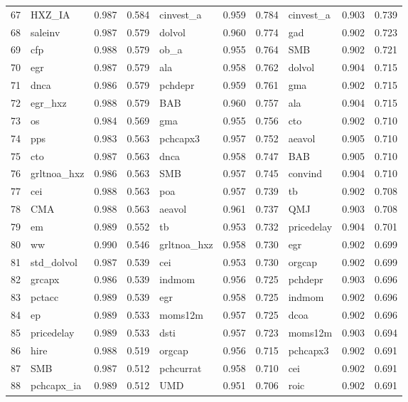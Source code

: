 \begin{landscape}
\begin{footnotesize}
\begin{longtable}{l|lcc|lcc|lcc}
  67 & HXZ\_IA & 0.987 & 0.584 & cinvest\_a & 0.959 & 0.784 & cinvest\_a & 0.903 & 0.739 \\ 
  68 & saleinv & 0.987 & 0.579 & dolvol & 0.960 & 0.774 & gad & 0.902 & 0.723 \\ 
  69 & cfp & 0.988 & 0.579 & ob\_a & 0.955 & 0.764 & SMB & 0.902 & 0.721 \\ 
  70 & egr & 0.987 & 0.579 & ala & 0.958 & 0.762 & dolvol & 0.904 & 0.715 \\ 
  71 & dnca & 0.986 & 0.579 & pchdepr & 0.959 & 0.761 & gma & 0.902 & 0.715 \\ 
  72 & egr\_hxz & 0.988 & 0.579 & BAB & 0.960 & 0.757 & ala & 0.904 & 0.715 \\ 
  73 & os & 0.984 & 0.569 & gma & 0.955 & 0.756 & cto & 0.902 & 0.710 \\ 
  74 & pps & 0.983 & 0.563 & pchcapx3 & 0.957 & 0.752 & aeavol & 0.905 & 0.710 \\ 
  75 & cto & 0.987 & 0.563 & dnca & 0.958 & 0.747 & BAB & 0.905 & 0.710 \\ 
  76 & grltnoa\_hxz & 0.986 & 0.563 & SMB & 0.957 & 0.745 & convind & 0.904 & 0.710 \\ 
  77 & cei & 0.988 & 0.563 & poa & 0.957 & 0.739 & tb & 0.902 & 0.708 \\ 
  78 & CMA & 0.988 & 0.563 & aeavol & 0.961 & 0.737 & QMJ & 0.903 & 0.708 \\ 
  79 & em & 0.989 & 0.552 & tb & 0.953 & 0.732 & pricedelay & 0.904 & 0.701 \\ 
  80 & ww & 0.990 & 0.546 & grltnoa\_hxz & 0.958 & 0.730 & egr & 0.902 & 0.699 \\ 
  81 & std\_dolvol & 0.987 & 0.539 & cei & 0.953 & 0.730 & orgcap & 0.902 & 0.699 \\ 
  82 & grcapx & 0.986 & 0.539 & indmom & 0.956 & 0.725 & pchdepr & 0.903 & 0.696 \\ 
  83 & pctacc & 0.989 & 0.539 & egr & 0.958 & 0.725 & indmom & 0.902 & 0.696 \\ 
  84 & ep & 0.989 & 0.533 & moms12m & 0.957 & 0.725 & dcoa & 0.902 & 0.696 \\ 
  85 & pricedelay & 0.989 & 0.533 & dsti & 0.957 & 0.723 & moms12m & 0.903 & 0.694 \\ 
  86 & hire & 0.988 & 0.519 & orgcap & 0.956 & 0.715 & pchcapx3 & 0.902 & 0.691 \\ 
  87 & SMB & 0.987 & 0.512 & pchcurrat & 0.958 & 0.710 & cei & 0.902 & 0.691 \\ 
  88 & pchcapx\_ia & 0.989 & 0.512 & UMD & 0.951 & 0.706 & roic & 0.902 & 0.691 \\ 

\end{longtable}
\end{footnotesize}
\end{landscape}
